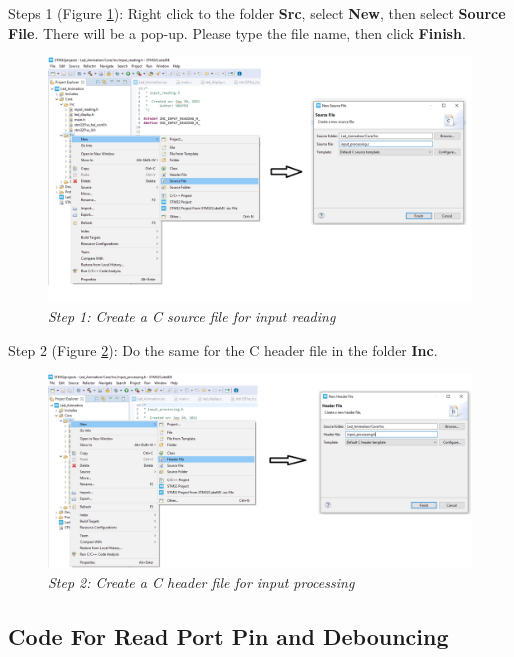 Steps 1 (Figure \ref{bai4_pic_Adding_new_files_to_project_step_1}): Right click to the folder \textbf{Src}, select \textbf{New}, then select \textbf{Source File}. There will be a pop-up. Please type the file name, then click \textbf{Finish}.
\begin{figure}[!htp]
    \centering
    \includegraphics[width=5.5in]{source/picture/bai_3/Adding_new_files_to_project_step_1.png}
    \caption{\textit{Step 1: Create a C source file for input reading}}
    \label{bai4_pic_Adding_new_files_to_project_step_1}
\end{figure}

Step 2 (Figure \ref{bai4_pic_Adding_new_files_to_project_step_3}): Do the same for the C header file in the folder \textbf{Inc}.
\begin{figure}[!htp]
    \centering
    \includegraphics[width=5.5in]{source/picture/bai_3/Adding_new_files_to_project_step_3.png}
    \caption{\textit{Step 2: Create a C header file for input processing}}
    \label{bai4_pic_Adding_new_files_to_project_step_3}
\end{figure}


\newpage

\newpage
\subsection{Code For Read Port Pin and Debouncing}

